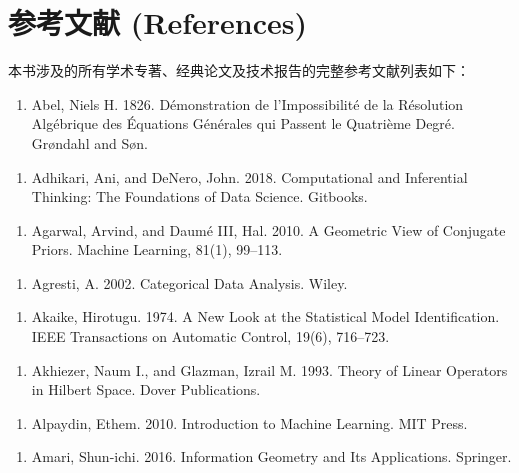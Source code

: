 \chapter*{参考文献 (References)}

本书涉及的所有学术专著、经典论文及技术报告的完整参考文献列表如下：

\begin{enumerate}
\item Abel, Niels H. 1826. Démonstration de l’Impossibilité de la Résolution Algébrique des Équations Générales qui Passent le Quatrième Degré. Grøndahl and Søn.
\end{enumerate}

\begin{enumerate}
\item Adhikari, Ani, and DeNero, John. 2018. Computational and Inferential Thinking: The Foundations of Data Science. Gitbooks.
\end{enumerate}

\begin{enumerate}
\item Agarwal, Arvind, and Daumé III, Hal. 2010. A Geometric View of Conjugate Priors. Machine Learning, 81(1), 99–113.
\end{enumerate}

\begin{enumerate}
\item Agresti, A. 2002. Categorical Data Analysis. Wiley.
\end{enumerate}

\begin{enumerate}
\item Akaike, Hirotugu. 1974. A New Look at the Statistical Model Identiﬁcation. IEEE Transactions on Automatic Control, 19(6), 716–723.
\end{enumerate}

\begin{enumerate}
\item Akhiezer, Naum I., and Glazman, Izrail M. 1993. Theory of Linear Operators in Hilbert Space. Dover Publications.
\end{enumerate}

\begin{enumerate}
\item Alpaydin, Ethem. 2010. Introduction to Machine Learning. MIT Press.
\end{enumerate}

\begin{enumerate}
\item Amari, Shun-ichi. 2016. Information Geometry and Its Applications. Springer.
\end{enumerate}


